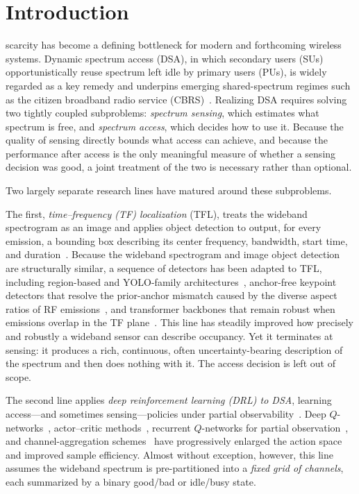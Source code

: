 \documentclass[journal]{IEEEtran}
\begin{document}
\section{Introduction}
\label{sec:introduction}

 scarcity has become a defining bottleneck for
modern and forthcoming wireless systems. Dynamic spectrum access (DSA),
in which secondary users (SUs) opportunistically reuse spectrum left idle by
primary users (PUs), is widely regarded as a key remedy and underpins
emerging shared-spectrum regimes such as the citizen broadband radio service
(CBRS)~\cite{sohul2015cbrs}. Realizing DSA requires solving two tightly
coupled subproblems: \emph{spectrum sensing}, which estimates what spectrum
is free, and \emph{spectrum access}, which decides how to use it. Because the
quality of sensing directly bounds what access can achieve, and because the
performance after access is the only meaningful measure of whether a sensing
decision was good, a joint treatment of the two is necessary rather than
optional.

Two largely separate research lines have matured around these subproblems.

The first, \emph{time--frequency (TF) localization} (TFL), treats the
wideband spectrogram as an image and applies object detection to output, for
every emission, a bounding box describing its center frequency, bandwidth,
start time, and duration~\cite{prasad2020,li2022hf}. Because the wideband
spectrogram and image object detection are structurally similar, a sequence
of detectors has been adapted to TFL, including region-based and YOLO-family
architectures~\cite{prasad2020,li2022hf}, anchor-free keypoint detectors that
resolve the prior-anchor mismatch caused by the diverse aspect ratios of RF
emissions~\cite{zhao2024uav}, and transformer backbones that remain robust
when emissions overlap in the TF plane~\cite{zhao2025trtfl_ssl,
zhang2024spectrumtransformer}. This line has steadily improved how precisely
and robustly a wideband sensor can describe occupancy. Yet it terminates at
sensing: it produces a rich, continuous, often uncertainty-bearing
description of the spectrum and then does nothing with it. The access
decision is left out of scope.

The second line applies \emph{deep reinforcement learning (DRL) to DSA},
learning access---and sometimes sensing---policies under partial
observability~\cite{wang2018,zhong2019,xu2020partial,li2020aggregation,
li2024hmadrl,bokobza2023ddqsa}. Deep $Q$-networks~\cite{wang2018},
actor--critic methods~\cite{zhong2019}, recurrent $Q$-networks for partial
observation~\cite{xu2020partial,hausknecht2015drqn}, and channel-aggregation
schemes~\cite{li2020aggregation} have progressively enlarged the action space
and improved sample efficiency. Almost without exception, however, this line
assumes the wideband spectrum is pre-partitioned into a \emph{fixed grid of
channels}, each summarized by a binary good/bad or idle/busy state.
\end{document}
